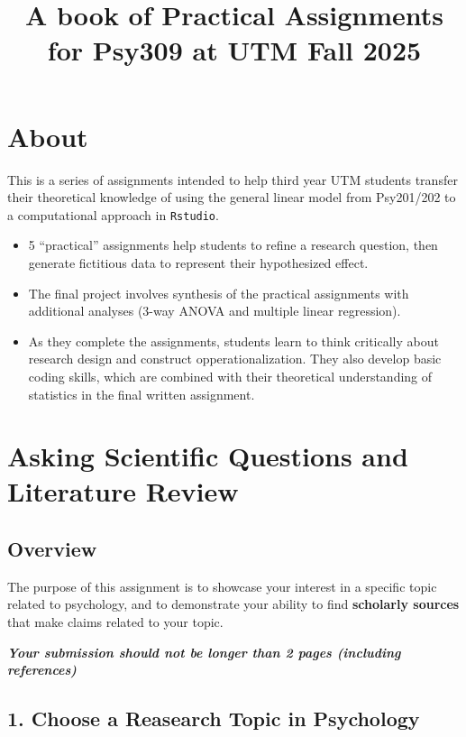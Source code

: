 \documentclass[
]{book}
\title{A book of Practical Assignments for Psy309 at UTM Fall 2025}
\author{}
\date{\vspace{-2.5em}}
\begin{document}
\maketitle

{
\setcounter{tocdepth}{1}
\tableofcontents
}
\chapter*{About}\label{about}

This is a series of assignments intended to help third year UTM students transfer their theoretical knowledge of using the general linear model from Psy201/202 to a computational approach in \texttt{Rstudio}.

\begin{itemize}
\item
  5 ``practical'' assignments help students to refine a research question, then generate fictitious data to represent their hypothesized effect.
\item
  The final project involves synthesis of the practical assignments with additional analyses (3-way ANOVA and multiple linear regression).
\item
  As they complete the assignments, students learn to think critically about research design and construct opperationalization. They also develop basic coding skills, which are combined with their theoretical understanding of statistics in the final written assignment.
\end{itemize}

\chapter{Asking Scientific Questions and Literature Review}\label{asking-scientific-questions-and-literature-review}

\section*{Overview}\label{overview}

The purpose of this assignment is to showcase your interest in a specific topic related to psychology, and to demonstrate your ability to find \textbf{scholarly sources} that make claims related to your topic.

\textbf{\emph{Your submission should not be longer than 2 pages (including references)}}

\section*{1. Choose a Reasearch Topic in Psychology}\label{choose-a-reasearch-topic-in-psychology}
\end{document}
